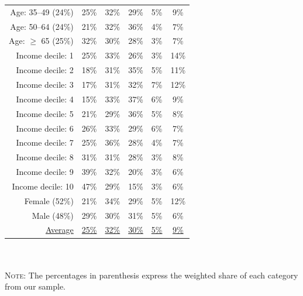 \documentclass[english,5p,authoryear]{elsarticle}
\begin{document}
\begin{appendices}
\begin{spacing}{1.8}
\begin{table}[ht]
{\begin{tabular}{rccccc}
  Age: 35--49 (24\%) & 25\% & 32\% & 29\% & 5\% & 9\% \\ 
  Age: 50--64 (24\%) & 21\% & 32\% & 36\% & 4\% & 7\% \\ 
  Age: $\geq$ 65 (25\%) & 32\% & 30\% & 28\% & 3\% & 7\% \\
  \hline
  Income decile: 1 & 25\% & 33\% & 26\% & 3\% & 14\% \\ 
  Income decile: 2 & 18\% & 31\% & 35\% & 5\% & 11\% \\
  Income decile: 3 & 17\% & 31\% & 32\% & 7\% & 12\% \\
  Income decile: 4 & 15\% & 33\% & 37\% & 6\% & 9\% \\
  Income decile: 5 & 21\% & 29\% & 36\% & 5\% & 8\% \\
  Income decile: 6 & 26\% & 33\% & 29\% & 6\% & 7\% \\
  Income decile: 7 & 25\% & 36\% & 28\% & 4\% & 7\% \\
  Income decile: 8 & 31\% & 31\% & 28\% & 3\% & 8\% \\
  Income decile: 9 & 39\% & 32\% & 20\% & 3\% & 6\% \\
  Income decile: 10 & 47\% & 29\% & 15\% & 3\% & 6\% \\
  \hline
  Female (52\%) & 21\% & 34\% & 29\% & 5\% & 12\% \\
  Male (48\%) & 29\% & 30\% & 31\% & 5\% & 6\% \\
  \hline
  \uline{Average} & \uline{25\%} & \uline{32\%} & \uline{30\%} & \uline{5\%} & \uline{9\%} \\ 
   \hline \hline
\end{tabular}
}
\\ $\quad$ \\
{\footnotesize \textsc{Note:} The percentages in parenthesis express the weighted share of each category from our sample.}
\label{tab:gilets_jaunes_agglo}
\end{table}
\end{spacing}




\end{appendices}
\end{document}
